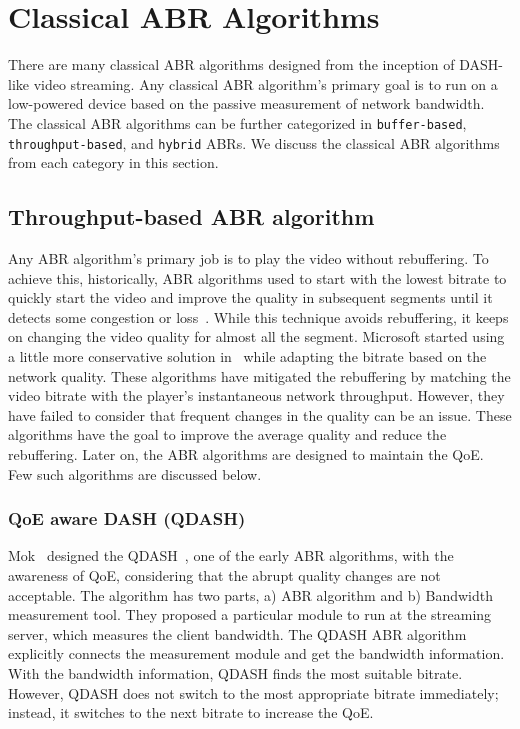 \section{Classical ABR Algorithms}
There are many classical ABR algorithms designed from the inception of DASH-like video streaming. Any classical ABR algorithm's primary goal is to run on a low-powered device based on the passive measurement of network bandwidth. The classical ABR algorithms can be further categorized in {\tt buffer-based}, {\tt throughput-based}, and {\tt hybrid} ABRs. We discuss the classical ABR algorithms from each category in this section.

\subsection{Throughput-based ABR algorithm}
Any ABR algorithm's primary job is to play the video without rebuffering. To achieve this, historically, ABR algorithms used to start with the lowest bitrate to quickly start the video and improve the quality in subsequent segments until it detects some congestion or loss~\cite{5677508,10.1145/1943552.1943575}. While this technique avoids rebuffering, it keeps on changing the video quality for almost all the segment. Microsoft started using a little more conservative solution in~\cite{10.1145/1943552.1943574} while adapting the bitrate based on the network quality. These algorithms have mitigated the rebuffering by matching the video bitrate with the player's instantaneous network throughput. However, they have failed to consider that frequent changes in the quality can be an issue. These algorithms have the goal to improve the average quality and reduce the rebuffering. Later on, the ABR algorithms are designed to maintain the QoE. Few such algorithms are discussed below. 

\subsubsection{QoE aware DASH (QDASH)}
Mok \etal\ designed the QDASH~\cite{10.1145/2155555.2155558}, one of the early ABR algorithms, with the awareness of QoE, considering that the abrupt quality changes are not acceptable. The algorithm has two parts, a) ABR algorithm and b) Bandwidth measurement tool. They proposed a particular module to run at the streaming server, which measures the client bandwidth. The QDASH ABR algorithm explicitly connects the measurement module and get the bandwidth information. With the bandwidth information, QDASH finds the most suitable bitrate. However, QDASH does not switch to the most appropriate bitrate immediately; instead, it switches to the next bitrate to increase the QoE.

